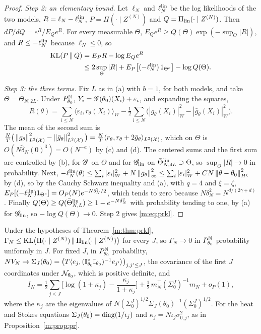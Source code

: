 \begin{proof}
\emph{Step 2: an elementary bound.} Let $\ell_N$ and $\ell^{\rm lin}_N$ be the log likelihoods of the two models, $R=\ell_N-\ell^{\rm lin}_N$, $P=\Pi(\cdot\mid Z^{(N)})$ and $Q=\Pi_{\rm lin}(\cdot\mid Z^{(N)})$. Then $dP/dQ=e^R/E_Qe^R$. For every measurable $\Theta$, $E_Qe^R\ge Q(\Theta)\exp(-\sup_\Theta|R|)$, and $R\le-\ell^{\rm lin}_N$ because $\ell_N\le0$, so
\[
\begin{aligned}
\mathrm{KL}(P\,\|\,Q)&=E_PR-\log E_Qe^R\\
&\le2\sup_\Theta|R|+E_P\big[(-\ell^{\rm lin}_N)\,1_{\Theta^c}\big]-\log Q(\Theta).
\end{aligned}
\]

\emph{Step 3: the three terms.} Fix $L$ as in (a) with $b=1$, for both models, and take $\Theta=\bar\Theta_{N,2L}$. Under $P^{\mathbb{N}}_{\theta_0}$, $Y_i=\mathscr{G}(\theta_0)(X_i)+\varepsilon_i$, and expanding the squares,
\[
R(\theta)=\sum_{i\le N}\langle\varepsilon_i,r_\theta(X_i)\rangle_W-\tfrac12\sum_{i\le N}\big(|g_\theta(X_i)|^2_W-|\bar g_\theta(X_i)|^2_W\big).
\]
The mean of the second sum is $\tfrac NT\big(\left\|g_\theta\right\|^2_{L^2(\mathcal X)}-\left\|\bar g_\theta\right\|^2_{L^2(\mathcal X)}\big)=\tfrac NT\langle r_\theta,r_\theta+2\bar g_\theta\rangle_{L^2(\mathcal X)}$, which on $\Theta$ is $O(N\tilde\delta_N(0)^3)=O(N^{-a})$ by (c) and (d). The centered sums and the first sum are controlled by (b), for $\mathscr{G}$ on $\Theta$ and for $\mathscr{G}_{\rm lin}$ on $\bar\Theta^{\rm lin}_{N,4L}\supset\Theta$, so $\sup_\Theta|R|\to0$ in probability. Next, $-\ell^{\rm lin}_N(\theta)\le\sum_i|\varepsilon_i|_W^2+N\left\|\bar g_\theta\right\|^2_\infty\le\sum_i|\varepsilon_i|_W^2+CN\left\|\theta-\theta_0\right\|^2_{H^\zeta}$ by (d), so by the Cauchy Schwarz inequality and (a), with $q=4$ and $\xi=\zeta$, $E_P[(-\ell^{\rm lin}_N)1_{\Theta^c}]=O_P(N)e^{-N\delta_N^2/2}$, which tends to zero because $N\delta_N^2=N^{d/(2\gamma+d)}$. Finally $Q(\Theta)\ge Q(\bar\Theta^{\rm lin}_{N,L})\ge1-e^{-N\delta_N^2}$ with probability tending to one, by (a) for $\mathscr{G}_{\rm lin}$, so $-\log Q(\Theta)\to0$. Step 2 gives \eqref{m:eq:prkl}.
\end{proof}

\begin{corollary}\label{m:cor:prreal}
Under the hypotheses of Theorem~\ref{m:thm:prkl}, $\Gamma_N\le\mathrm{KL}\big(\Pi(\cdot\mid Z^{(N)})\,\|\,\Pi_{\rm lin}(\cdot\mid Z^{(N)})\big)$ for every $J$, so $\Gamma_N\to0$ in $P^{\mathbb{N}}_{\theta_0}$ probability uniformly in $J$. For fixed $J$, in $P^{\mathbb{N}}_{\theta_0}$ probability, $NV_N\to\Sigma_J(\theta_0)=\big(T\langle e_j,(\mathbb{I}^*_{\theta_0}\mathbb{I}_{\theta_0})^{-1}e_{j'}\rangle\big)_{j,j'\le J}$, the covariance of the first $J$ coordinates under $\mathcal{N}_{\theta_0}$, which is positive definite, and
\begin{equation}\label{m:eq:prreal}
I_N=\tfrac12\sum_{j\le J}\Big[\log(1+\kappa_j)-\frac{\kappa_j}{1+\kappa_j}\Big]+\tfrac12\,m_N^\top(\Sigma^J_0)^{-1}m_N+o_P(1),
\end{equation}
where the $\kappa_j$ are the eigenvalues of $N(\Sigma^J_0)^{1/2}\Sigma_J(\theta_0)^{-1}(\Sigma^J_0)^{1/2}$. For the heat and Stokes equations $\Sigma_J(\theta_0)=\operatorname{diag}(1/\iota_j)$ and $\kappa_j=N\iota_j\sigma^2_{0,j}$, as in Proposition~\ref{m:prop:pr}.
\end{corollary}

